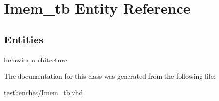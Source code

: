 \hypertarget{class_imem__tb}{\section{\-Imem\-\_\-tb \-Entity \-Reference}
\label{class_imem__tb}
}
\subsection*{\-Entities}
\begin{DoxyCompactItemize}
\item 
\hyperlink{class_imem__tb_1_1behavior}{behavior} architecture
\end{DoxyCompactItemize}


\-The documentation for this class was generated from the following file\-:\begin{DoxyCompactItemize}
\item 
testbenches/\hyperlink{_imem__tb_8vhd}{\-Imem\-\_\-tb.\-vhd}\end{DoxyCompactItemize}
